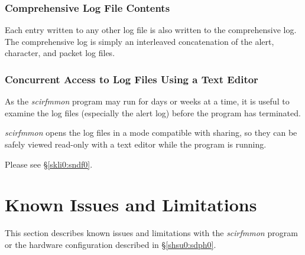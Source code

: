\documentclass[letterpaper,10pt,titlepage]{article}
\newcommand{\productname}{scirfmmon}
\newcommand{\productnameemph}{\emph{\productname}}
\begin{document}
\subsubsection{Comprehensive Log File Contents}
\label{susg0:slgf0:shlf0}

Each entry written to any other log file is also written to the
comprehensive log.  The comprehensive log is simply an interleaved concatenation
of the alert, character, and packet log files.


\subsubsection{Concurrent Access to Log Files Using a Text Editor}
\label{susg0:slgf0:scat0}

As the \productnameemph{} program may run for days or weeks at a time,
it is useful to examine the log files (especially the alert log) before
the program has terminated.

\productnameemph{} opens the log files in a mode compatible with sharing,
so they can be safely viewed read-only with a text editor while the program
is running.

Please see \S{}\ref{skli0:sndf0}.


\section{Known Issues and Limitations}
\label{skli0}

This section describes known issues and limitations with the
\productnameemph{} program or the hardware configuration
described in \S{}\ref{shsu0:sdph0}.


\end{document}
